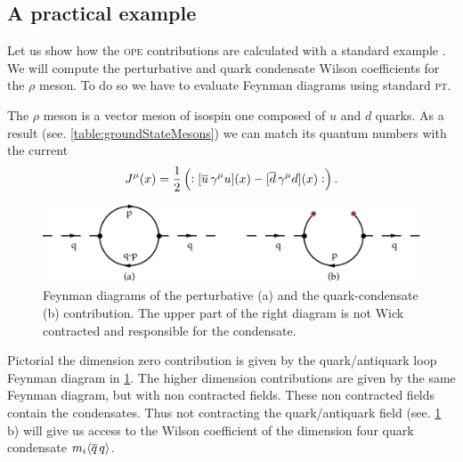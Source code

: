 \documentclass[../../index.tex]{subfiles}
\begin{document}
\subsection{A practical example}
Let us show how the \textsc{ope} contributions are calculated with a standard
example \cite{Shifman1978, Pascual1984}. We will compute the perturbative and
quark condensate Wilson coefficients for the \(\rho\) meson. To do so we have to
evaluate Feynman diagrams using standard \textsc{pt}.

The \(\rho\) meson is a vector meson of isospin one composed of \(u\) and \(d\)
quarks. As a result (see. \cref{table:groundStateMesons}) we can match its
quantum numbers with the current
\begin{equation}
  J^\mu(x) = \frac{1}{2}\left(:[\overline{u}\, \gamma^\mu u](x) - [\overline{d}\, \gamma^\mu d](x):\right).
\end{equation}
\begin{figure}
  \centering
  \includegraphics[width=\textwidth]{./images/condensateFeynmanDiagram.eps}
  \caption{Feynman diagrams of the perturbative (a) and the quark-condensate (b)
    contribution. The upper part of the right diagram is not Wick contracted and
    responsible for the condensate.}
  \label{fig:OPEFeynmanDiagram}
\end{figure}
Pictorial the dimension zero contribution is given by the quark\-/antiquark loop
Feynman diagram in \cref{fig:OPEFeynmanDiagram}. The higher dimension
contributions are given by the same Feynman diagram, but with non contracted
fields. These non contracted fields contain the condensates. Thus not
contracting the quark\-/antiquark field (see. \cref{fig:OPEFeynmanDiagram} b)
will give us access to the Wilson coefficient of the dimension four quark
condensate \(m_i \langle \overline{q}\,q \rangle\).
\end{document}
